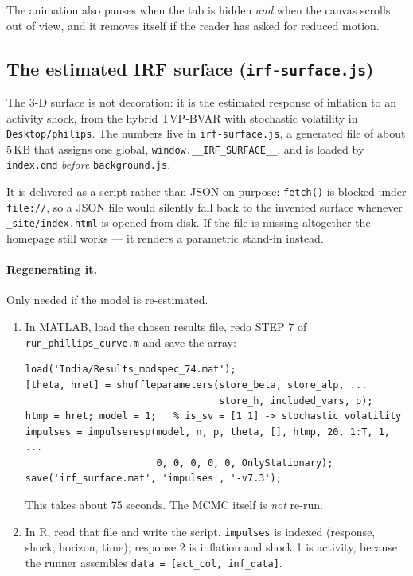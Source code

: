 \documentclass[11pt,a4paper]{article}
\newcommand{\file}[1]{\texttt{#1}}
\begin{document}
The animation also pauses when the tab is hidden \emph{and} when the canvas
scrolls out of view, and it removes itself if the reader has asked for
reduced motion.

\subsection{The estimated IRF surface (\file{irf-surface.js})}
\label{sec:irfdata}

The 3-D surface is not decoration: it is the estimated response of inflation
to an activity shock, from the hybrid TVP-BVAR with stochastic volatility in
\file{Desktop/philips}. The numbers live in \file{irf-surface.js}, a
generated file of about 5\,KB that assigns one global,
\texttt{window.\_\_IRF\_SURFACE\_\_}, and is loaded by \file{index.qmd}
\emph{before} \file{background.js}.

It is delivered as a script rather than JSON on purpose: \texttt{fetch()} is
blocked under \texttt{file://}, so a JSON file would silently fall back to
the invented surface whenever \file{\_site/index.html} is opened from disk.
If the file is missing altogether the homepage still works --- it renders a
parametric stand-in instead.

\paragraph{Regenerating it.} Only needed if the model is re-estimated.

\begin{enumerate}[itemsep=2pt]
\item In MATLAB, load the chosen results file, redo STEP 7 of
      \file{run\_phillips\_curve.m} and save the array:
\begin{lstlisting}
load('India/Results_modspec_74.mat');
[theta, hret] = shuffleparameters(store_beta, store_alp, ...
                                  store_h, included_vars, p);
htmp = hret; model = 1;   % is_sv = [1 1] -> stochastic volatility
impulses = impulseresp(model, n, p, theta, [], htmp, 20, 1:T, 1, ...
                       0, 0, 0, 0, 0, OnlyStationary);
save('irf_surface.mat', 'impulses', '-v7.3');
\end{lstlisting}
      This takes about 75 seconds. The MCMC itself is \emph{not} re-run.
\item In R, read that file and write the script. \texttt{impulses} is
      indexed (response, shock, horizon, time); response 2 is inflation and
      shock 1 is activity, because the runner assembles
      \texttt{data = [act\_col, inf\_data]}.
\end{enumerate}
\end{document}
